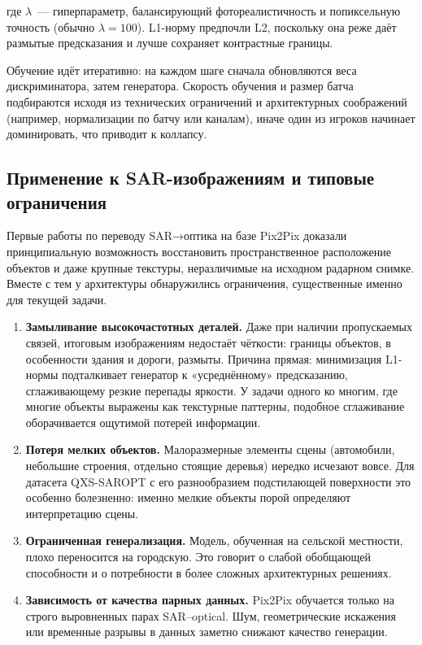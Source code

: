 где $\lambda$~--- гиперпараметр, балансирующий фотореалистичность и попиксельную точность (обычно $\lambda = 100$). L1-норму предпочли L2, поскольку она реже даёт размытые предсказания и лучше сохраняет контрастные границы.

Обучение идёт итеративно: на каждом шаге сначала обновляются веса дискриминатора, затем генератора.
Скорость обучения и размер батча подбираются исходя из технических ограничений и архитектурных соображений (например, нормализации по батчу или каналам), иначе один из игроков начинает доминировать, что приводит к коллапсу.

\subsection{Применение к SAR-изображениям и типовые ограничения}

Первые работы по переводу SAR→оптика на базе Pix2Pix доказали принципиальную возможность восстановить пространственное расположение объектов и даже крупные текстуры, неразличимые на исходном радарном снимке.
Вместе с тем у архитектуры обнаружились ограничения, существенные именно для текущей задачи.

\begin{enumerate}
    \item \textbf{Замыливание высокочастотных деталей.} Даже при наличии пропускаемых связей, итоговым изображениям недостаёт чёткости: границы объектов, в особенности здания и дороги, размыты. Причина прямая: минимизация L1-нормы подталкивает генератор к «усреднённому» предсказанию, сглаживающему резкие перепады яркости. У задачи одного ко многим, где многие объекты выражены как текстурные паттерны, подобное сглаживание оборачивается ощутимой потерей информации.
    \item \textbf{Потеря мелких объектов.} Малоразмерные элементы сцены (автомобили, небольшие строения, отдельно стоящие деревья) нередко исчезают вовсе. Для датасета QXS-SAROPT с его разнообразием подстилающей поверхности это особенно болезненно: именно мелкие объекты порой определяют интерпретацию сцены.
    \item \textbf{Ограниченная генерализация.} Модель, обученная на сельской местности, плохо переносится на городскую. Это говорит о слабой обобщающей способности и о потребности в более сложных архитектурных решениях.
    \item \textbf{Зависимость от качества парных данных.} Pix2Pix обучается только на строго выровненных парах SAR--optical. Шум, геометрические искажения или временные разрывы в данных заметно снижают качество генерации.
\end{enumerate}

